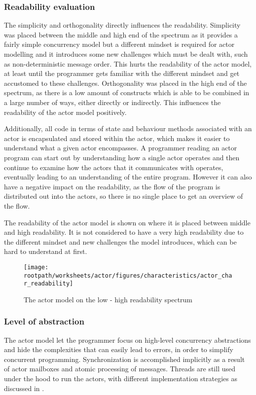\subsubsection{Readability evaluation}
The simplicity and orthogonality directly influences the readability. Simplicity was placed between the middle and high end of the spectrum as it provides a fairly simple concurrency model but a different mindset is required for actor modelling and it introduces some new challenges which must be dealt with, such as non-deterministic message order. This hurts the readability of the actor model, at least until the programmer gets familiar with the different mindset and get accustomed to these challenges. Orthogonality was placed in the high end of the spectrum, as there is a low amount of constructs which is able to be combined in a large number of ways, either directly or indirectly. This influences the readability of the actor model positively.

Additionally, all code in terms of state and behaviour methods associated with an actor is encapsulated and stored within the actor, which makes it easier to understand what a given actor encompasses. A programmer reading an actor program can start out by understanding how a single actor operates and then continue to examine how the actors that it communicates with operates, eventually leading to an understanding of the entire program. However it can also have a negative impact on the readability, as the flow of the program is distributed out into the actors, so there is no single place to get an overview of the flow. 

The readability of the actor model is shown on  where it is placed between middle and high readability. It is not considered to have a very high readability due to the different mindset and new challenges the model introduces, which can be hard to understand at first.

\begin{figure}[htbp]
\centering
 \texttt{[image: \\rootpath/worksheets/actor/figures/characteristics/actor\_char\_readability]} 
 \caption{The actor model on the low - high readability spectrum}
\label{fig:actor_readability}
\end{figure}

\subsubsection{Level of abstraction}\label{sec:actor_level_of_abstraction}
The actor model let the programmer focus on high-level concurrency abstractions and hide the complexities that can easily lead to errors, in order to simplify concurrent programming. Synchronization is accomplished implicitly as a result of actor mailboxes and atomic processing of messages. Threads are still used under the hood to run the actors, with different implementation strategies as discussed in .

